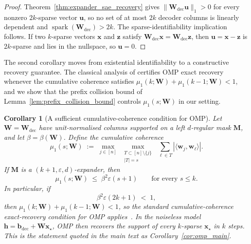 \documentclass{article}
\theoremstyle{plain}
\newtheorem{corollary}[theorem]{Corollary}
\theoremstyle{definition}
\theoremstyle{remark}
\begin{document}
\begin{proof}
Theorem~\ref{thm:expander_sae_recovery} gives $\|\mathbf{W}_{\mathrm{dec}}\mathbf{u}\|_1 > 0$ for every nonzero $2k$-sparse vector $\mathbf{u}$, so no set of at most $2k$ decoder columns is linearly dependent and $\operatorname{spark}(\mathbf{W}_{\mathrm{dec}}) > 2k$. The sparse-identifiability implication follows. If two $k$-sparse vectors $\mathbf{x}$ and $\mathbf{z}$ satisfy $\mathbf{W}_{\mathrm{dec}}\mathbf{x} = \mathbf{W}_{\mathrm{dec}}\mathbf{z}$, then $\mathbf{u} = \mathbf{x} - \mathbf{z}$ is $2k$-sparse and lies in the nullspace, so $\mathbf{u} = 0$.
\end{proof}

The second corollary moves from existential identifiability to a constructive recovery guarantee. The classical analysis of \citet{tropp2004greed} certifies OMP exact recovery whenever the cumulative coherence satisfies $\mu_1(k; \mathbf{W}) + \mu_1(k-1; \mathbf{W}) < 1$, and we show that the prefix collision bound of Lemma~\ref{lem:prefix_collision_bound} controls $\mu_1(s; \mathbf{W})$ in our setting.

\begin{corollary}[A sufficient cumulative-coherence condition for OMP]
\label{cor:omp_coherence}
Let $\mathbf{W} = \mathbf{W}_{\mathrm{dec}}$ have unit-normalised columns supported on a left $d$-regular mask $\mathbf{M}$, and let $\beta = \beta(\mathbf{W})$. Define the cumulative coherence
\[
    \mu_1(s; \mathbf{W})
    \;:=\;
    \max_{j \in [n]}\;
    \max_{\substack{T \subset [n] \setminus \{j\} \\ |T| = s}}\;
    \sum_{\ell \in T}
    |\langle \mathbf{w}_j, \mathbf{w}_\ell \rangle|.
\]
If $\mathbf{M}$ is a $(k+1, \varepsilon, d)$-expander, then
\[
    \mu_1(s; \mathbf{W}) \;\le\; \beta^2 \varepsilon (s + 1)
    \qquad \text{for every } s \le k.
\]
In particular, if
\begin{equation}
\label{eq:omp_coherence_condition}
    \beta^2 \varepsilon (2k + 1) \;<\; 1,
\end{equation}
then $\mu_1(k; \mathbf{W}) + \mu_1(k-1; \mathbf{W}) < 1$, so the standard cumulative-coherence exact-recovery condition for OMP applies~\citep{tropp2004greed}. In the noiseless model $\mathbf{h} = \mathbf{b}_{\mathrm{dec}} + \mathbf{W}\mathbf{x}_\star$, OMP then recovers the support of every $k$-sparse $\mathbf{x}_\star$ in $k$ steps. This is the statement quoted in the main text as Corollary~\ref{cor:omp_main}.
\end{corollary}
\end{document}

